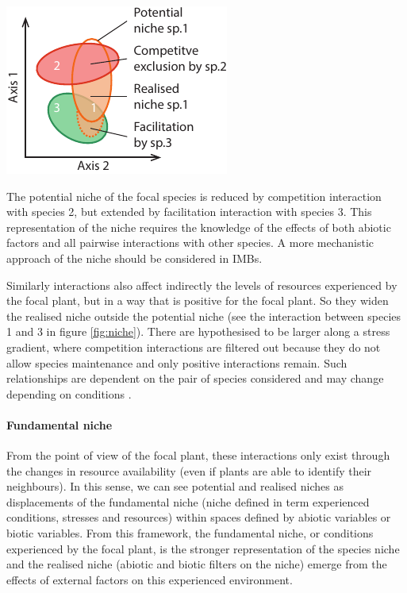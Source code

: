 \begin{marginfigure}
    \includegraphics{./1_Introduction/graphics/niches.pdf}
  \caption[Different niches]{The potential niche of the \textcolor{myOrange}{focal} species is reduced by competition interaction with \textcolor{myRed}{species 2}, but extended by facilitation interaction with \textcolor{myGreen}{species 3}. This representation of the niche requires the knowledge of the effects of both abiotic factors and all pairwise interactions with other species. A more mechanistic approach of the niche should be considered in IMBs.}
  \label{fig:niche}
\end{marginfigure}

Similarly  interactions also affect indirectly the levels of resources experienced by the focal plant, but in a way that is positive for the focal plant. So they widen the realised niche outside the potential niche (see the interaction between species 1 and 3 in figure \ref{fig:niche}). There are hypothesised to be larger along a stress gradient, where competition interactions are filtered out because they do not allow species maintenance and only positive interactions remain. Such relationships are dependent on the pair of species considered and may change depending on conditions \parencite{callaway_phenotypic_2003}.

\paragraph{Fundamental niche}
 From the point of view of the focal plant, these interactions only exist through the changes in resource availability (even if plants are able to identify their neighbours). In this sense, we can see potential and realised niches as displacements of the fundamental niche (niche defined in term experienced conditions, stresses and resources) within spaces defined by abiotic variables or biotic variables. From this framework, the fundamental niche, or conditions experienced by the focal plant, is the stronger representation of the species niche and the realised niche (abiotic and biotic filters on the niche) emerge from the effects of external factors on this experienced environment.

